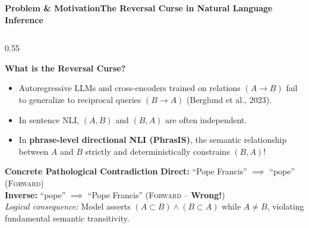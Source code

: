 \documentclass[aspectratio=169,10pt]{beamer}
\begin{document}
\begin{frame}{\textbf{Problem \& Motivation}}{\textbf{The Reversal Curse in Natural Language Inference}}
  \begin{columns}[T]
    \begin{column}{0.55\textwidth}
      \begin{block}{\textbf{What is the Reversal Curse?}}
        \footnotesize
        \begin{itemize}\setlength{\itemsep}{1pt}\setlength{\parskip}{0pt}
          \item Autoregressive LLMs and cross-encoders trained on relations $(A \to B)$ fail to generalize to reciprocal queries $(B \to A)$ (Berglund et al., 2023).
          \item In sentence NLI, $(A, B)$ and $(B, A)$ are often independent.
          \item In \textbf{phrase-level directional NLI (PhrasIS)}, the semantic relationship between $A$ and $B$ strictly and deterministically constrains $(B, A)$!
        \end{itemize}
      \end{block}
      \vspace{0.05cm}
      \begin{alertblock}{\textbf{Concrete Pathological Contradiction}}
        \footnotesize
        \textbf{Direct:} ``Pope Francis'' $\implies$ ``pope'' \quad (\textsc{Forward}) \\
        \textbf{Inverse:} ``pope'' $\implies$ ``Pope Francis'' \quad (\textsc{Forward} -- \textbf{Wrong!}) \\
        \textit{Logical consequence:} Model asserts $(A \subset B) \land (B \subset A)$ while $A \neq B$, violating fundamental semantic transitivity.
      \end{alertblock}
    \end{column}


\end{columns}
\end{frame}
\end{document}
